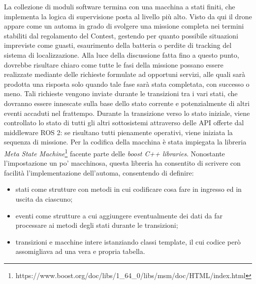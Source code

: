 \indent La collezione di moduli software termina con una macchina a stati finiti, che implementa la logica di supervisione posta al livello più alto. Visto da qui il drone appare come un automa in grado di svolgere una missione completa nei termini stabiliti dal regolamento del Contest, gestendo per quanto possibile situazioni impreviste come guasti, esaurimento della batteria o perdite di tracking del sistema di localizzazione. Alla luce della discussione fatta fino a questo punto, dovrebbe risultare chiaro come tutte le fasi della missione possano essere realizzate mediante delle richieste formulate ad opportuni servizi, alle quali sarà prodotta una risposta solo quando tale fase sarà stata completata, con successo o meno. Tali richieste vengono inviate durante le transizioni tra i vari stati, che dovranno essere innescate sulla base dello stato corrente e potenzialmente di altri eventi accaduti nel frattempo. Durante la transizione verso lo stato iniziale, viene controllato lo stato di tutti gli altri sottosistemi attraverso delle API offerte dal middleware ROS 2: se risultano tutti pienamente operativi, viene iniziata la sequenza di missione. Per la codifica della macchina è stata impiegata la libreria \emph{Meta State Machine}\footnote{https://www.boost.org/doc/libs/1\_64\_0/libs/msm/doc/HTML/index.html} facente parte delle \emph{boost C++ libraries}. Nonostante l'impostazione un po' macchinosa, questa libreria ha consentito di scrivere con facilità l'implementazione dell'automa, consentendo di definire:
\begin{itemize}
    \item stati come strutture con metodi in cui codificare cosa fare in ingresso ed in uscita da ciascuno;
    \item eventi come strutture a cui aggiungere eventualmente dei dati da far processare ai metodi degli stati durante le transizioni;
    \item transizioni e macchine intere istanziando classi template, il cui codice però assomigliava ad una vera e propria tabella.
\end{itemize}
